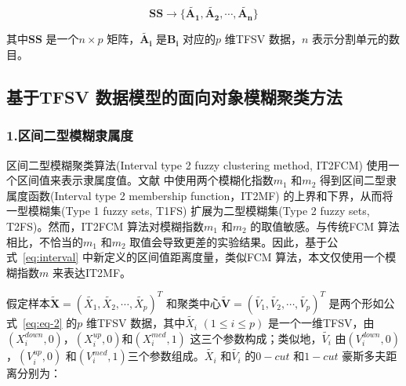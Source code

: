 \begin{equation}\label{eq:eq-2}
    \bm{SS} \to \lbrace \bm{\tilde{A_1}}, \bm{\tilde{A_2}},\bm{\cdots}, \bm{\tilde{A_n}} \rbrace
\end{equation}

其中$\bm{SS}$ 是一个$n \times p$ 矩阵，$\bm{\tilde{A_i}}$ 是$\bm{B_i}$ 对应的$p$ 维TFSV 数据，$n$ 表示分割单元的数目。


\subsection{基于TFSV 数据模型的面向对象模糊聚类方法}
\label{subsec::chap03-3-2}


\subsubsection*{1.区间二型模糊隶属度}
\label{subsec::chap03-3-3-2-1}
区间二型模糊聚类算法(Interval type 2 fuzzy clustering method, IT2FCM) 使用一个区间值来表示隶属度值。文献\cite{hwang2007uncertain} 中使用两个模糊化指数$m_1$ 和$m_2$ 得到区间二型隶属度函数(Interval type 2 membership function，IT2MF) 的上界和下界，从而将一型模糊集(Type 1 fuzzy sets, T1FS) 扩展为二型模糊集(Type 2 fuzzy sets, T2FS)。然而，IT2FCM 算法对模糊指数$m_1$ 和$m_2$ 的取值敏感。与传统FCM 算法相比，不恰当的$m_1$ 和$m_2$ 取值会导致更差的实验结果。因此，基于公式~\ref{eq:interval} 中新定义的区间值距离度量，类似FCM 算法，本文仅使用一个模糊指数$m$ 来表达IT2MF。


假定样本$\bm{\tilde{X}} = (\tilde{X_1}, \tilde{X_2},\cdots, \tilde{X_p})^T$ 和聚类中心$\bm{\tilde{V}} = (\tilde{V_1}, \tilde{V_2},\cdots, \tilde{V_p})^T$ 是两个形如公式~\ref{eq:eq-2} 的$p$ 维TFSV 数据，其中$\tilde{X_i}$ $(1 \leq i \leq p)$ 是一个一维TFSV，由$(X_{i}^{down}, 0)$，$(X_{i}^{up}, 0)$和$(X_i^{med}, 1)$ 这三个参数构成；类似地，$\tilde{V_i}$ 由$(V_{i}^{down}, 0)$，$(V_{i}^{up}, 0)$ 和$(V_i^{med}, 1)$三个参数组成。$\tilde{X_i}$ 和$\tilde{V_i}$ 的$0-cut$ 和$1-cut$ 豪斯多夫距离分别为：

